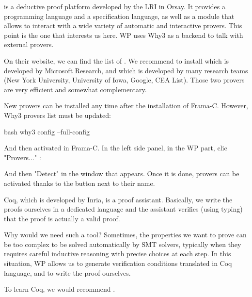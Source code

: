

 is a deductive proof platform
developed by the LRI in Orsay. It
provides a programming language and a specification language, as well as
a module that allows to interact with a wide variety of automatic and
interactive provers. This point is the one that interests us here. WP uses
Why3 as a backend to talk with external provers.


On their website, we can find the list of
.
We recommend to install
 which is
developed by Microsoft Research, and
 which is developed by many
research teams (New York University, University of Iowa, Google, CEA
List). Those two provers are very efficient and somewhat complementary.


New provers can be installed any time after the installation of Frama-C.
However, Why3 provers list must be updated:

\begin{CodeBlock}{bash}
why3 config --full-config
\end{CodeBlock}

And then activated in Frama-C. In the left side panel, in the WP part,
clic "Provers..." :




And then "Detect" in the window that appears. Once it is done, provers
can be activated thanks to the button next to their name.






Coq, which is developed by Inria, is a proof assistant. Basically, we
write the proofs ourselves in a dedicated language and the assistant
verifies (using typing) that the proof is actually a valid proof.



Why would we need such a tool? Sometimes, the properties we want to
prove can be too complex to be solved automatically by SMT solvers,
typically when they requires careful inductive reasoning with precise
choices at each step. In this situation, WP allows us to generate
verification conditions translated in Coq language, and to write the
proof ourselves.




To learn Coq, we would recommend
.



